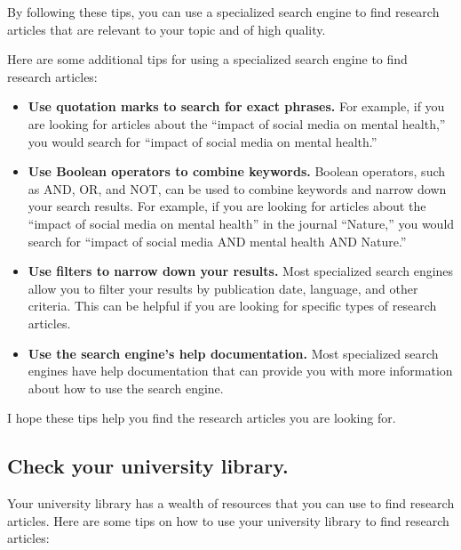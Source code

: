 \documentclass[
  b5paper]{book}
\begin{document}
By following these tips, you can use a specialized search engine to find research articles that are relevant to your topic and of high quality.

Here are some additional tips for using a specialized search engine to find research articles:

\begin{itemize}
\item
  \textbf{Use quotation marks to search for exact phrases.} For example, if you are looking for articles about the ``impact of social media on mental health,'' you would search for ``impact of social media on mental health.''
\item
  \textbf{Use Boolean operators to combine keywords.} Boolean operators, such as AND, OR, and NOT, can be used to combine keywords and narrow down your search results. For example, if you are looking for articles about the ``impact of social media on mental health'' in the journal ``Nature,'' you would search for ``impact of social media AND mental health AND Nature.''
\item
  \textbf{Use filters to narrow down your results.} Most specialized search engines allow you to filter your results by publication date, language, and other criteria. This can be helpful if you are looking for specific types of research articles.
\item
  \textbf{Use the search engine's help documentation.} Most specialized search engines have help documentation that can provide you with more information about how to use the search engine.
\end{itemize}

I hope these tips help you find the research articles you are looking for.

\hypertarget{check-your-university-library.}{%
\subsection*{Check your university library.}\label{check-your-university-library.}}

Your university library has a wealth of resources that you can use to find research articles. Here are some tips on how to use your university library to find research articles:
\end{document}
